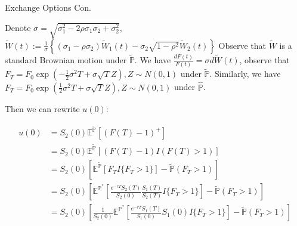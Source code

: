 \documentclass{beamer}
\begin{document}
\begin{frame}{Exchange Options Con.}
    
    {\footnotesize \footnotesize
    \par Denote $\sigma  = \sqrt{\sigma_1^2 - 2\rho\sigma_1\sigma_2 + \sigma_2^2}$, $\tilde{W}(t) := \frac{1}{\sigma} \left\{ (\sigma_1 - \rho\sigma_2)\tilde{W}_1(t) - \sigma_2\sqrt{1 - \rho^2}\tilde{W}_2(t) \right\}$
    Observe that $\tilde{W}$ is a standard Brownian motion under $\tilde{\mathbb{P}}$. 
    We have $\frac{dF(t)}{F(t)} = \sigma d\tilde{W}(t)$, observe that $F_T = F_0 \exp \left( - \frac{1}{2} \sigma^2 T 
    + \sigma \sqrt{T} Z \right),  Z \sim N(0, 1)$ under $\tilde{\mathbb{P}}$. Similarly, we have 
    $F_T = F_0 \exp \left(  \frac{1}{2} \sigma^2 T 
    + \sigma \sqrt{T} Z \right),  Z \sim N(0, 1)$ under $\hat{\mathbb{P}}$.\pause
    \vspace{1em}
     \par Then we can rewrite $u(0)$:
     
     \begin{align*}
        u(0) &= S_2(0) \mathbb{E}^{\tilde{\mathbb{P}}} \left[ (F(T) - 1)^+ \right]\\
        &= S_2(0) \mathbb{E}^{\tilde{\mathbb{P}}} \left[ (F(T) - 1)I(F(T)>1) \right]\\
        &=S_2(0) \left[ \mathbb{E}^{\tilde{\mathbb{P}}}[F_T I{\{F_T > 1\}}] 
        - \tilde{\mathbb{P}}(F_T > 1)\right] \\
        &=S_2(0) \left[ \mathbb{E}^{\mathbb{P}^*}[\frac{e^{-rT} S_2(T)}{S_2(0)} \frac{S_1(T)}{S_2(T)} I{\{F_T > 1\}}] 
        - \tilde{\mathbb{P}}(F_T > 1)\right] \\
        &=S_2(0) \left[ \frac{1}{S_2(0)}\mathbb{E}^{\mathbb{P}^*}[\frac{e^{-rT} S_1(T)}{S_1(0)} S_1(0) I{\{F_T > 1\}}] 
        - \tilde{\mathbb{P}}(F_T > 1)\right] \\
     \end{align*}
    
    }

\end{frame}
\end{document}
